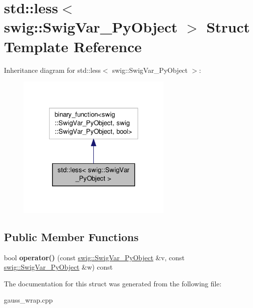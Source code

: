 \hypertarget{structstd_1_1less_3_01swig_1_1_swig_var___py_object_01_4}{\section{std\-:\-:less$<$ swig\-:\-:Swig\-Var\-\_\-\-Py\-Object $>$ Struct Template Reference}
\label{structstd_1_1less_3_01swig_1_1_swig_var___py_object_01_4}
}


Inheritance diagram for std\-:\-:less$<$ swig\-:\-:Swig\-Var\-\_\-\-Py\-Object $>$\-:\nopagebreak
\begin{figure}[H]
\begin{center}
\leavevmode
\includegraphics[width=214pt]{structstd_1_1less_3_01swig_1_1_swig_var___py_object_01_4__inherit__graph}
\end{center}
\end{figure}
\subsection*{Public Member Functions}
\begin{DoxyCompactItemize}
\item 
\hypertarget{structstd_1_1less_3_01swig_1_1_swig_var___py_object_01_4_a7cfb709f8a11671ebbf9839e953b3a97}{bool {\bfseries operator()} (const \hyperlink{structswig_1_1_swig_var___py_object}{swig\-::\-Swig\-Var\-\_\-\-Py\-Object} \&v, const \hyperlink{structswig_1_1_swig_var___py_object}{swig\-::\-Swig\-Var\-\_\-\-Py\-Object} \&w) const }\label{structstd_1_1less_3_01swig_1_1_swig_var___py_object_01_4_a7cfb709f8a11671ebbf9839e953b3a97}

\end{DoxyCompactItemize}


The documentation for this struct was generated from the following file\-:\begin{DoxyCompactItemize}
\item 
gauss\-\_\-wrap.\-cpp\end{DoxyCompactItemize}

